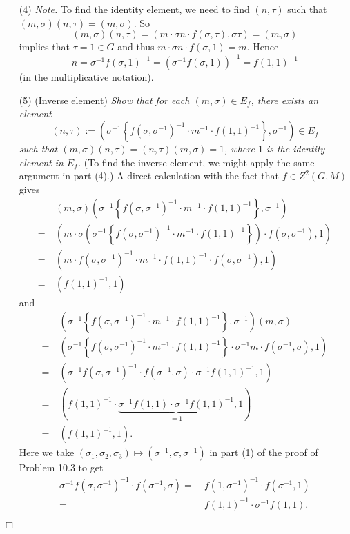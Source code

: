 \documentclass{article}
\begin{document}
\begin{enumerate}
\item[(4)]
  \emph{Note.}
  To find the identity element, we need to find $(n,\tau)$
  such that $(m,\sigma)(n,\tau) = (m,\sigma)$.
  So
  \[
    (m,\sigma)(n,\tau) = (m \cdot \sigma n \cdot f(\sigma,\tau), \sigma\tau) = (m,\sigma)
  \]
  implies that $\tau = 1 \in G$ and thus $m \cdot \sigma n \cdot f(\sigma,1) = m$.
  Hence
  \[
    n
    = \sigma^{-1} f(\sigma,1)^{-1}
    = (\sigma^{-1} f(\sigma,1))^{-1}
    = f(1,1)^{-1}
  \]
  (in the multiplicative notation).

\item[(5)]
  (Inverse element)
  \emph{Show that for each $(m,\sigma) \in E_f$,
  there exists an element
  \[
    (n,\tau)
    :=
    \left(\sigma^{-1}\left\{f(\sigma,\sigma^{-1})^{-1} \cdot m^{-1} \cdot f(1,1)^{-1}\right\}, \sigma^{-1} \right)
    \in E_f
  \]
  such that
  $(m,\sigma)(n,\tau) = (n,\tau)(m,\sigma) = 1$, where $1$ is the identity element in $E_f$.}
  (To find the inverse element, we might apply the same argument in part (4).)
  A direct calculation with the fact that $f \in Z^2(G,M)$ gives
  \begin{align*}
    & \:
    (m,\sigma)
    \left(\sigma^{-1}\left\{f(\sigma,\sigma^{-1})^{-1} \cdot m^{-1} \cdot f(1,1)^{-1}\right\}, \sigma^{-1} \right) \\
    = & \:
    (m \cdot \sigma\left(\sigma^{-1}\left\{f(\sigma,\sigma^{-1})^{-1} \cdot m^{-1} \cdot f(1,1)^{-1}\right\}\right)
        \cdot f(\sigma, \sigma^{-1}), 1) \\
    = & \:
    (m \cdot f(\sigma,\sigma^{-1})^{-1} \cdot m^{-1} \cdot f(1,1)^{-1}
        \cdot f(\sigma, \sigma^{-1}), 1) \\
    = & \:
    (f(1,1)^{-1}, 1)
  \end{align*}
  and
  \begin{align*}
    & \:
    \left(\sigma^{-1}\left\{f(\sigma,\sigma^{-1})^{-1} \cdot m^{-1} \cdot f(1,1)^{-1}\right\}, \sigma^{-1} \right)
    (m,\sigma) \\
    = & \:
    (\sigma^{-1}\left\{f(\sigma,\sigma^{-1})^{-1} \cdot m^{-1} \cdot f(1,1)^{-1}\right\}
        \cdot \sigma^{-1} m \cdot f(\sigma^{-1}, \sigma), 1) \\
    = & \:
    (\sigma^{-1} f(\sigma,\sigma^{-1})^{-1}
        \cdot f(\sigma^{-1}, \sigma) \cdot \sigma^{-1} f(1,1)^{-1}, 1) \\
    = & \:
    (f(1,1)^{-1} \cdot \underbrace{\sigma^{-1} f(1,1) \cdot \sigma^{-1} f(1,1)^{-1}}_{= 1}, 1) \\
    = & \:
    (f(1,1)^{-1}, 1).
  \end{align*}
  Here we take $(\sigma_1, \sigma_2, \sigma_3) \mapsto (\sigma^{-1}, \sigma, \sigma^{-1})$
  in part (1) of the proof of Problem 10.3 to get
  \begin{align*}
    \sigma^{-1} f(\sigma,\sigma^{-1})^{-1} \cdot f(\sigma^{-1}, \sigma)
    = & \:
    f(1,\sigma^{-1})^{-1} \cdot f(\sigma^{-1},1) \\
    = & \:
    f(1,1)^{-1} \cdot \sigma^{-1} f(1,1).
  \end{align*}
\end{enumerate}
$\Box$ \\\\
\end{document}
